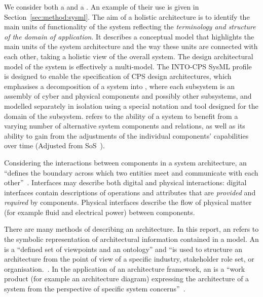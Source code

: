We consider both a  and a . An example of their use is given in Section~\ref{sec:method:sysml}. The aim of a holistic architecture is to identify the main units of functionality of the system reflecting the \emph{terminology and structure of the domain of application}. It describes a conceptual model that highlights the main units of the system architecture and the way these units are connected with each other, taking a holistic view of the overall system. The design architectural model of the system is effectively a multi-model. The INTO-CPS SysML profile~\cite{INTOCPSD2.1a} is designed to enable the specification of CPS design architectures, which emphasises a decomposition of a system into , where each subsystem is an assembly of cyber and physical components and possibly other subsystems, and modelled separately in isolation using a special notation and tool designed for the domain of the subsystem.  refers to the ability of a system to benefit from a varying number of alternative system components and relations, as well as its ability to gain from the adjustments of the individual components' capabilities over time (Adjusted from SoS~\cite{Nielsen&13}).

Considering the interactions between components in a system architecture, an  ``defines the boundary across which two entities meet and communicate with each other''~\cite{Holt&14}. Interfaces may describe both digital and physical interactions: digital interfaces  contain descriptions of operations and attributes that are \emph{provided} and \emph{required} by components. Physical interfaces describe the flow of physical matter (for example fluid and electrical power) between components.

There are many methods of describing an architecture. In this report, an  refers to the symbolic representation of architectural information contained in a model. An  is a ``defined set of viewpoints and an ontology'' and ``is used to structure an architecture from the point of view of a specific industry, stakeholder role set, or organisation.~\cite{Holt&14}. In the application of an architecture framework, an  is a ``work product (for example an architecture diagram) expressing the architecture of a system from the perspective of specific system concerns''~\cite{COMPASSD22.6}.

